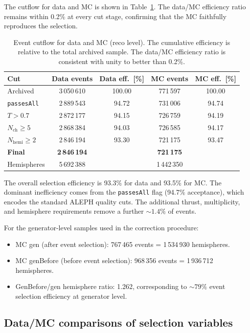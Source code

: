 \documentclass[11pt,a4paper]{article}
\begin{document}
The cutflow for data and MC is shown in Table~\ref{tbl:cutflow}.
The data/MC efficiency ratio remains within 0.2\% at every cut stage,
confirming that the MC faithfully reproduces the selection.

\begin{table}[htbp]
\centering
\caption{Event cutflow for data and MC (reco level).  The cumulative
  efficiency is relative to the total archived sample.  The data/MC
  efficiency ratio is consistent with unity to better than 0.2\%.}
\label{tbl:cutflow}
\begin{tabular}{lcccc}
\toprule
Cut & Data events & Data eff.\ [\%] & MC events & MC eff.\ [\%] \\
\midrule
Archived & 3\,050\,610 & 100.00 & 771\,597 & 100.00 \\
\texttt{passesAll} & 2\,889\,543 & 94.72 & 731\,006 & 94.74 \\
$T > 0.7$ & 2\,872\,177 & 94.15 & 726\,759 & 94.19 \\
$N_\text{ch} \ge 5$ & 2\,868\,384 & 94.03 & 726\,585 & 94.17 \\
$N_\text{hemi} \ge 2$ & 2\,846\,194 & 93.30 & 721\,175 & 93.47 \\
\midrule
\textbf{Final} & \textbf{2\,846\,194} & & \textbf{721\,175} & \\
Hemispheres & 5\,692\,388 & & 1\,442\,350 & \\
\bottomrule
\end{tabular}
\end{table}

The overall selection efficiency is 93.3\% for data and 93.5\% for MC.
The dominant inefficiency comes from the \texttt{passesAll} flag
(94.7\% acceptance), which encodes the standard ALEPH quality cuts.
The additional thrust, multiplicity, and hemisphere requirements remove
a further $\sim\!1.4\%$ of events.

For the generator-level samples used in the correction procedure:
\begin{itemize}
\item MC gen (after event selection): 767\,465 events = 1\,534\,930
  hemispheres.
\item MC genBefore (before event selection): 968\,356 events =
  1\,936\,712 hemispheres.
\item GenBefore/gen hemisphere ratio: 1.262, corresponding to
  $\sim\!79\%$ event selection efficiency at generator level.
\end{itemize}

\subsection{Data/MC comparisons of selection variables}
\label{sec:data-mc-selection}
\end{document}
